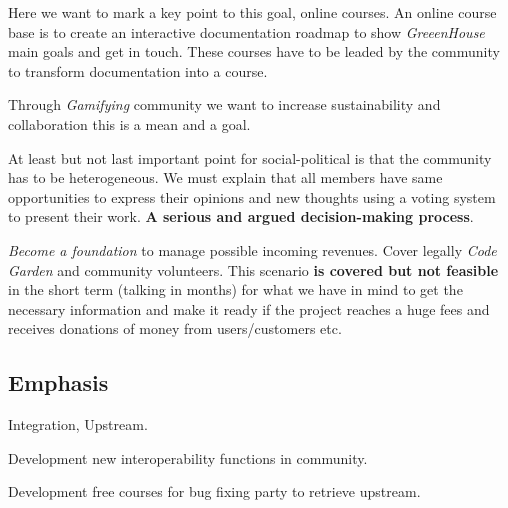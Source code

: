 \documentclass[11pt]{scrartcl}
\begin{document}
\par Here we want to mark a key point to this goal, online courses. An online course base is to create an interactive documentation roadmap to show \emph{GreeenHouse} main goals and get in touch. These courses have to be leaded by the community to transform documentation into a course.

\par Through \emph{Gamifying} community we want to increase sustainability and collaboration this is a mean and a goal.

\par At least but not last important point for social-political is that the community has to be heterogeneous. We must explain that all members have same opportunities to express their opinions and new thoughts using a voting system to present their work. \textbf{A serious and argued decision-making process}.

\par \emph{Become a foundation} to manage possible incoming revenues. Cover legally \emph{Code Garden} and community volunteers. This scenario \textbf{is covered but not feasible} in the short term (talking in months) for what we have in mind to get the necessary information and make it ready if the project reaches a huge fees and receives donations of money from users/customers etc.


\subsection{Emphasis}
\label{sub:emphasis}

\par Integration, Upstream.

\par Development new interoperability functions in community.
\par Development free courses for bug fixing party to retrieve upstream.


\end{document}
